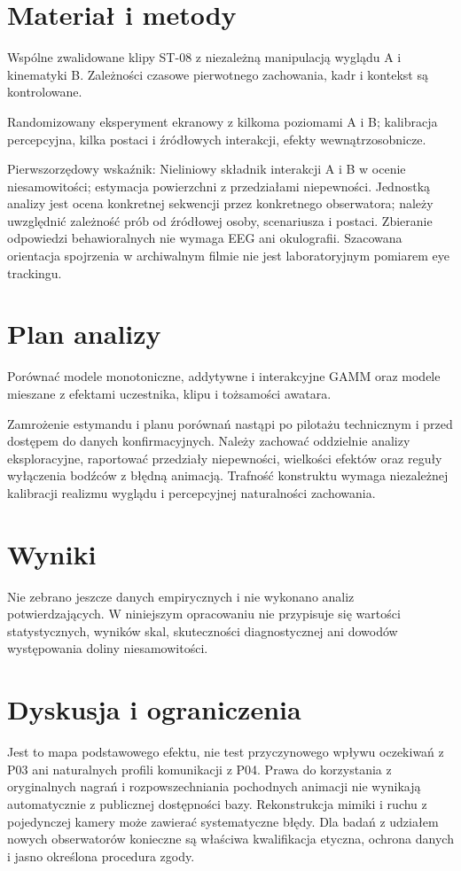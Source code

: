 \documentclass[11pt,a4paper]{article}
\begin{document}
\section{Materiał i metody}
Wspólne zwalidowane klipy ST-08 z niezależną manipulacją wyglądu A i kinematyki B. Zależności czasowe pierwotnego zachowania, kadr i kontekst są kontrolowane.

Randomizowany eksperyment ekranowy z kilkoma poziomami A i B; kalibracja percepcyjna, kilka postaci i źródłowych interakcji, efekty wewnątrzosobnicze.

Pierwszorzędowy wskaźnik: Nieliniowy składnik interakcji A i B w ocenie niesamowitości; estymacja powierzchni z przedziałami niepewności. Jednostką analizy jest ocena konkretnej sekwencji przez konkretnego obserwatora; należy uwzględnić zależność prób od źródłowej osoby, scenariusza i postaci. Zbieranie odpowiedzi behawioralnych nie wymaga EEG ani okulografii. Szacowana orientacja spojrzenia w archiwalnym filmie nie jest laboratoryjnym pomiarem eye trackingu.
\section{Plan analizy}
Porównać modele monotoniczne, addytywne i interakcyjne GAMM oraz modele mieszane z efektami uczestnika, klipu i tożsamości awatara.

Zamrożenie estymandu i planu porównań nastąpi po pilotażu technicznym i przed dostępem do danych konfirmacyjnych. Należy zachować oddzielnie analizy eksploracyjne, raportować przedziały niepewności, wielkości efektów oraz reguły wyłączenia bodźców z błędną animacją. Trafność konstruktu wymaga niezależnej kalibracji realizmu wyglądu i percepcyjnej naturalności zachowania.
\section{Wyniki}
Nie zebrano jeszcze danych empirycznych i nie wykonano analiz potwierdzających. W niniejszym opracowaniu nie przypisuje się wartości statystycznych, wyników skal, skuteczności diagnostycznej ani dowodów występowania doliny niesamowitości.
\section{Dyskusja i ograniczenia}
Jest to mapa podstawowego efektu, nie test przyczynowego wpływu oczekiwań z P03 ani naturalnych profili komunikacji z P04. Prawa do korzystania z oryginalnych nagrań i rozpowszechniania pochodnych animacji nie wynikają automatycznie z publicznej dostępności bazy. Rekonstrukcja mimiki i ruchu z pojedynczej kamery może zawierać systematyczne błędy. Dla badań z udziałem nowych obserwatorów konieczne są właściwa kwalifikacja etyczna, ochrona danych i jasno określona procedura zgody.
\end{document}
